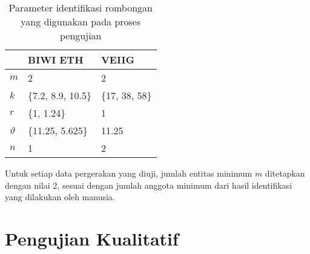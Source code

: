 \begin{table}[h]
    \centering
    \begin{tabular}{p{1cm} p{3cm} p{3cm}}
        \hline
        & \textbf{BIWI ETH} & \textbf{VEIIG} \\
        \hline
        $m$ & 2 & 2 \\
        $k$ & \{7.2, 8.9, 10.5\} & \{17, 38, 58\} \\
        $r$ & \{1, 1.24\} & 1 \\
        $\vartheta$ & \{11.25, 5.625\} & 11.25 \\
        $n$ & 1 & 2 \\
        \hline
    \end{tabular}
    \caption[Parameter identifikasi rombongan]{Parameter identifikasi rombongan yang digunakan pada proses pengujian}
    \label{bab6:parameter}
\end{table}

Untuk setiap data pergerakan yang diuji, jumlah entitas minimum $m$ ditetapkan dengan nilai 2, sesuai dengan jumlah anggota minimum dari hasil identifikasi yang dilakukan oleh manusia.

\section{Pengujian Kualitatif}
\label{sec:qualitative}